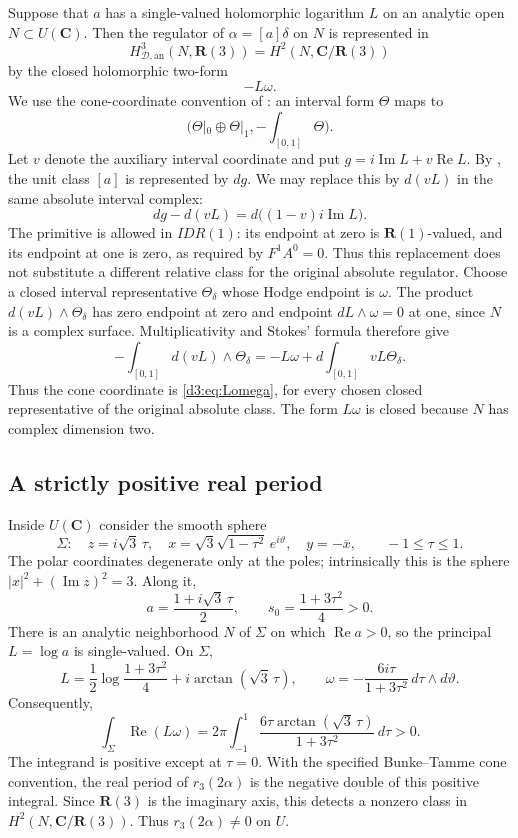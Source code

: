 \documentclass[11pt,a4paper]{amsart}
\numberwithin{equation}{section}
\theoremstyle{definition}
\theoremstyle{remark}
\newcommand{\R}{\mathbf R}
\newcommand{\C}{\mathbf C}
\newcommand{\HD}{H_{\mathcal D,\mathrm{an}}}
\begin{document}
Suppose that $a$ has a single-valued holomorphic logarithm $L$ on an analytic open $N\subset U(\C)$. Then the regulator of $\alpha=[a]\delta$ on $N$ is represented in
\[
\HD^3(N,\R(3))=H^2(N,\C/\R(3))
\]
by the closed holomorphic two-form
\begin{equation}\label{d3:eq:Lomega}
-L\omega.
\end{equation}
We use the cone-coordinate convention of \cite[Proposition~2.8]{BunkeTamme}: an interval form $\Theta$ maps to
\[
\bigl(\Theta|_0\oplus\Theta|_1,-\textstyle\int_{[0,1]}\Theta\bigr).
\]
Let $v$ denote the auxiliary interval coordinate and put $g=i\operatorname{Im}L+v\operatorname{Re}L$.
By \cite[Lemma~4.5]{BunkeTamme}, the unit class $[a]$ is represented by $dg$.
We may replace this by $d(vL)$ in the same absolute interval complex:
\[
dg-d(vL)=d\bigl((1-v)i\operatorname{Im}L\bigr).
\]
The primitive is allowed in $IDR(1)$: its endpoint at zero is
$\R(1)$-valued, and its endpoint at one is zero, as required by
$F^1A^0=0$. Thus this replacement does not substitute a different
relative class for the original absolute regulator.
Choose a closed interval representative $\Theta_\delta$ whose Hodge endpoint is $\omega$.
The product $d(vL)\wedge\Theta_\delta$ has zero endpoint at zero and
endpoint $dL\wedge\omega=0$ at one, since $N$ is a complex surface.
Multiplicativity and Stokes' formula therefore give
\[
-\int_{[0,1]}d(vL)\wedge\Theta_\delta
=-L\omega+d\int_{[0,1]}vL\Theta_\delta.
\]
Thus the cone coordinate is \eqref{d3:eq:Lomega}, for every chosen
closed representative of the original absolute class. The form
$L\omega$ is closed because $N$ has complex dimension two.

\subsection{A strictly positive real period}
Inside $U(\C)$ consider the smooth sphere
\[
\Sigma:\quad z=i\sqrt3\,\tau,\quad
x=\sqrt3\sqrt{1-\tau^2}\,e^{i\vartheta},\quad
y=-\overline x,\qquad -1\leq\tau\leq1.
\]
The polar coordinates degenerate only at the poles; intrinsically this is the sphere $|x|^2+(\operatorname{Im}z)^2=3$. Along it,
\[
a=\frac{1+i\sqrt3\,\tau}{2},\qquad
s_0=\frac{1+3\tau^2}{4}>0.
\]
There is an analytic neighborhood $N$ of $\Sigma$ on which $\operatorname{Re}a>0$, so the principal $L=\log a$ is single-valued. On $\Sigma$,
\[
L=\frac12\log\frac{1+3\tau^2}{4}+i\arctan(\sqrt3\,\tau),
\qquad
\omega=-\frac{6i\tau}{1+3\tau^2}\,d\tau\wedge d\vartheta.
\]
Consequently,
\begin{equation}\label{d3:eq:positiveperiod}
\int_{\Sigma}\operatorname{Re}(L\omega)
=2\pi\int_{-1}^{1}
\frac{6\tau\arctan(\sqrt3\,\tau)}{1+3\tau^2}\,d\tau>0.
\end{equation}
The integrand is positive except at $\tau=0$. With the specified Bunke--Tamme cone convention, the real period of $r_3(2\alpha)$ is the negative double of this positive integral. Since $\R(3)$ is the imaginary axis, this detects a nonzero class in $H^2(N,\C/\R(3))$. Thus $r_3(2\alpha)\neq0$ on $U$.
\end{document}
